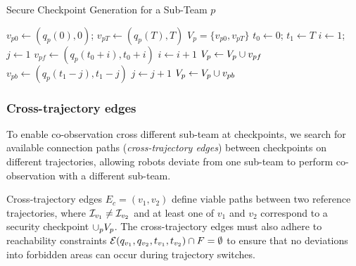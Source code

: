 \documentclass[10pt,twocolumn,twoside]{IEEEtran}
\begin{document}
\begin{algorithm}
  \caption{Secure Checkpoint Generation for a Sub-Team $p$}\label{alg:checkpoint-gen}
  \begin{algorithmic}
  \State $v_{p0} \gets (q_{p}(0),0)$; $v_{pT} \gets (q_{p}(T),T)$
  \State $V_{p} = \{v_{p0}, v_{pT}\}$
  \State $t_0 \gets 0$; $t_1 \gets T$
    \State $i \gets 1$; $j\gets 1$
      \State $v_{pf} \gets (q_{p}(t_0+i),t_0+i)$
      \State $i \gets i+1$
    \EndWhile
    \State $V_{p}\gets V_{p}\cup v_{pf}$
    \State $v_{pb} \gets (q_{p}(t_1-j),t_1-j)$
    \State $j \gets j+1$
    \EndWhile
    \State $V_{p}\gets V_{p}\cup v_{pb}$
    \EndIf
  \EndWhile
  \end{algorithmic}
  \end{algorithm}


\subsubsection{Cross-trajectory edges}\label{sec:cross-traj-edges}
To enable co-observation cross different sub-team at checkpoints, we search for available connection paths (\emph{cross-trajectory edges}) between checkpoints on different trajectories, allowing robots deviate from one sub-team to perform co-observation with a different sub-team. 

Cross-trajectory edges $E_c = (v_1, v_2)$ define viable paths between two reference trajectories, where $\mathcal{I}_{v_1}\neq\mathcal{I}_{v_2}$ and at least one of $v_1 $ and $v_2$ correspond to a security checkpoint $\cup_p V_p$. The cross-trajectory edges must also adhere to reachability constraints $\mathcal{E}(q_{v_1}, q_{v_2}, t_{v_1},t_{v_2}) \cap F = \emptyset$ to ensure that no deviations into forbidden areas can occur during trajectory switches.  
\end{document}
